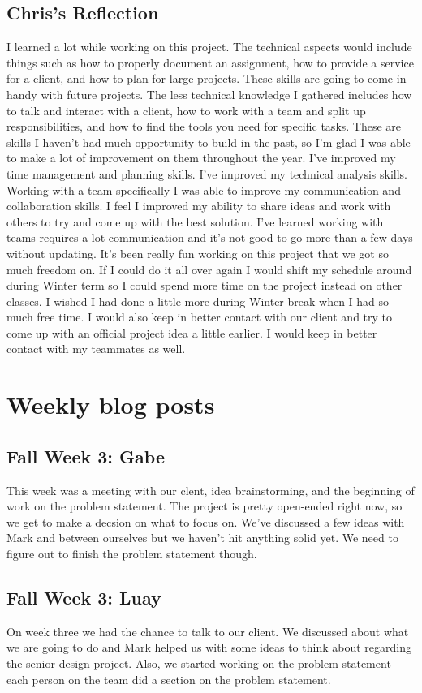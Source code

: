 \documentclass[onecolumn, draftclsnofoot,10pt, compsoc]{IEEEtran}
\begin{document}
\subsection{Chris's Reflection}
I learned a lot while working on this project.
The technical aspects would include things such as how to properly document an assignment, how to provide a service for a client, and how to plan for large projects.
These skills are going to come in handy with future projects.
The less technical knowledge I gathered includes how to talk and interact with a client, how to work with a team and split up responsibilities, and how to find the tools you need for specific tasks.
These are skills I haven't had much opportunity to build in the past, so I'm glad I was able to make a lot of improvement on them throughout the year.
I've improved my time management and planning skills.
I've improved my technical analysis skills.
Working with a team specifically I was able to improve my communication and collaboration skills.
I feel I improved my ability to share ideas and work with others to try and come up with the best solution.
I've learned working with teams requires a lot communication and it's not good to go more than a few days without updating.
It's been really fun working on this project that we got so much freedom on.
If I could do it all over again I would shift my schedule around during Winter term so I could spend more time on the project instead on other classes.
I wished I had done a little more during Winter break when I had so much free time.
I would also keep in better contact with our client and try to come up with an official project idea a little earlier.
I would keep in better contact with my teammates as well.


\section{Weekly blog posts}
\subsection{Fall Week 3: Gabe}
This week was a meeting with our clent, idea brainstorming, and the beginning of work on the problem statement. The project is pretty open-ended right now, so we get to make a decsion on what to focus on. We've discussed a few ideas with Mark and between ourselves but we haven't hit anything solid yet. We need to figure out to finish the problem statement though.
\subsection{Fall Week 3: Luay}
On week three we had the chance to talk to our client. We discussed about what we are going to do and Mark helped us with some ideas to think about regarding the senior design project. Also, we started working on the problem statement each person on the team did a section on the problem statement.
\end{document}
